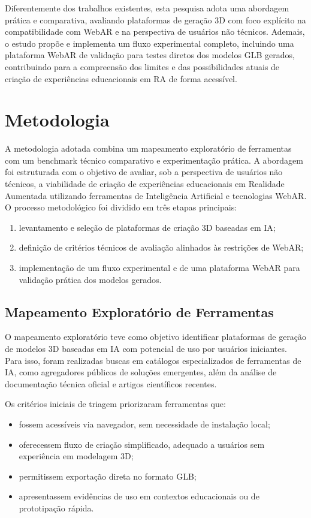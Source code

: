 \documentclass[conference]{IEEEtran}
\begin{document}
Diferentemente dos trabalhos existentes, esta pesquisa adota uma abordagem prática e comparativa, avaliando plataformas de geração 3D com foco explícito na compatibilidade com WebAR e na perspectiva de usuários não técnicos. Ademais, o estudo propõe e implementa um fluxo experimental completo, incluindo uma plataforma WebAR de validação para testes diretos dos modelos GLB gerados, contribuindo para a compreensão dos limites e das possibilidades atuais de criação de experiências educacionais em RA de forma acessível.

\section{Metodologia}

A metodologia adotada combina um mapeamento exploratório de ferramentas com um benchmark técnico comparativo e experimentação prática. A abordagem foi estruturada com o objetivo de avaliar, sob a perspectiva de usuários não técnicos, a viabilidade de criação de experiências educacionais em Realidade Aumentada utilizando ferramentas de Inteligência Artificial e tecnologias WebAR. O processo metodológico foi dividido em três etapas principais:

\begin{enumerate}
    \item levantamento e seleção de plataformas de criação 3D baseadas em IA;
    \item definição de critérios técnicos de avaliação alinhados às restrições de WebAR;
    \item implementação de um fluxo experimental e de uma plataforma WebAR para validação prática dos modelos gerados.
\end{enumerate}

\subsection{Mapeamento Exploratório de Ferramentas}

O mapeamento exploratório teve como objetivo identificar plataformas de geração de modelos 3D baseadas em IA com potencial de uso por usuários iniciantes. Para isso, foram realizadas buscas em catálogos especializados de ferramentas de IA, como agregadores públicos de soluções emergentes, além da análise de documentação técnica oficial e artigos científicos recentes.

Os critérios iniciais de triagem priorizaram ferramentas que:
\begin{itemize}
    \item fossem acessíveis via navegador, sem necessidade de instalação local;
    \item oferecessem fluxo de criação simplificado, adequado a usuários sem experiência em modelagem 3D;
    \item permitissem exportação direta no formato GLB;
    \item apresentassem evidências de uso em contextos educacionais ou de prototipação rápida.
\end{itemize}
\end{document}

